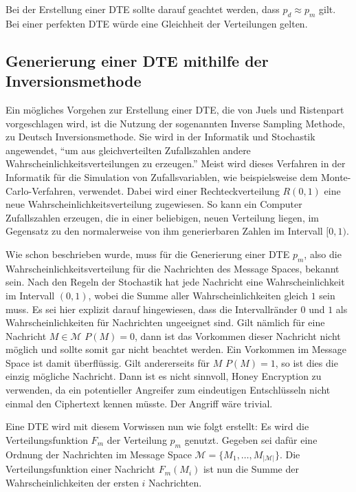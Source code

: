 Bei der Erstellung einer DTE sollte darauf geachtet werden, dass $p_d \approx p_m$ gilt. Bei einer perfekten DTE würde eine Gleichheit der Verteilungen gelten.

\subsection{Generierung einer DTE mithilfe der Inversionsmethode}

Ein mögliches Vorgehen zur Erstellung einer DTE, die von Juels und Ristenpart \cite{EURO2014} vorgeschlagen wird, ist die Nutzung der sogenannten Inverse Sampling Methode, zu Deutsch Inversionsmethode. Sie wird in der Informatik und Stochastik angewendet, ``um aus gleichverteilten Zufallszahlen andere Wahrscheinlichkeitsverteilungen zu erzeugen.'' \cite{WIKIInv} Meist wird dieses Verfahren in der Informatik für die Simulation von Zufallsvariablen, wie beispielsweise dem Monte-Carlo-Verfahren, verwendet. Dabei wird einer Rechteckverteilung $R(0,1)$ eine neue Wahrscheinlichkeitsverteilung zugewiesen. So kann ein Computer Zufallszahlen erzeugen, die in einer beliebigen, neuen Verteilung liegen, im Gegensatz zu den normalerweise von ihm generierbaren Zahlen im Intervall $[0,1)$.

Wie schon beschrieben wurde, muss für die Generierung einer DTE $p_m$, also die Wahrscheinlichkeitsverteilung für die Nachrichten des Message Spaces, bekannt sein. Nach den Regeln der Stochastik hat jede Nachricht eine Wahrscheinlichkeit im Intervall $(0,1)$, wobei die Summe aller Wahrscheinlichkeiten gleich $1$ sein muss. Es sei hier explizit darauf hingewiesen, dass die Intervallränder $0$ und $1$ als Wahrscheinlichkeiten für Nachrichten ungeeignet sind. Gilt nämlich für eine Nachricht $M \in \mathcal{M}$ $P(M) = 0$, dann ist das Vorkommen dieser Nachricht nicht möglich und sollte somit gar nicht beachtet werden. Ein Vorkommen im Message Space ist damit überflüssig. Gilt andererseits für $M$ $P(M) = 1$, so ist dies die einzig mögliche Nachricht. Dann ist es nicht sinnvoll, Honey Encryption zu verwenden, da ein potentieller Angreifer zum eindeutigen Entschlüsseln nicht einmal den Ciphertext kennen müsste. Der Angriff wäre trivial.

Eine DTE wird mit diesem Vorwissen nun wie folgt erstellt: Es wird die Verteilungsfunktion $F_m$ der Verteilung $p_m$ genutzt. Gegeben sei dafür eine Ordnung der Nachrichten im Message Space $\mathcal{M} = \{M_1, \dots, M_{|\mathcal{M}|}\}$. Die Verteilungsfunktion einer Nachricht $F_m(M_i)$ ist nun die Summe der Wahrscheinlichkeiten der ersten $i$ Nachrichten.

